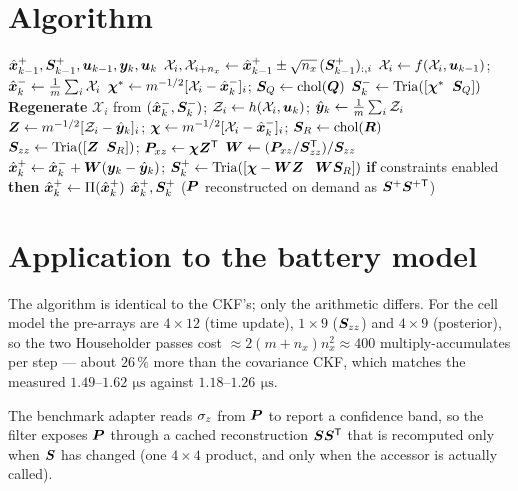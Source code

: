 \section{Algorithm}
\begin{algorithm}[H]
\caption{SCKF --- one sampling period (additive noise)}
\begin{algorithmic}[1]
\Require $\hat{\bm{x}}^{+}_{k-1},\bm{S}^+_{k-1},\bm{u}_{k-1},\bm{y}_k,\bm{u}_k$
\State $\mathcal{X}_{i},\mathcal{X}_{i+n_x}\gets\hat{\bm{x}}^{+}_{k-1}\pm\sqrt{n_x}\,(\bm{S}^+_{k-1})_{:,i}$
\State $\mathcal{X}_i \gets f(\mathcal{X}_i,\bm{u}_{k-1})$;\; $\hat{\bm{x}}^{-}_k\gets\frac{1}{m}\sum_i\mathcal{X}_i$
\State $\bm{\chi}^*\gets m^{-1/2}[\mathcal{X}_i-\hat{\bm{x}}^{-}_k]_i$;\; $\bm{S}_Q\gets\operatorname{chol}(\bm{Q})$
\State $\bm{S}^-_k\gets\operatorname{Tria}([\bm{\chi}^*\;\;\bm{S}_Q])$
\State \textbf{Regenerate} $\mathcal{X}_i$ from $(\hat{\bm{x}}^{-}_k,\bm{S}^-_k)$;\;
       $\mathcal{Z}_i\gets h(\mathcal{X}_i,\bm{u}_k)$;\; $\hat{\bm{y}}_k\gets\frac1m\sum_i\mathcal{Z}_i$
\State $\bm{Z}\gets m^{-1/2}[\mathcal{Z}_i-\hat{\bm{y}}_k]_i$;\; $\bm{\chi}\gets m^{-1/2}[\mathcal{X}_i-\hat{\bm{x}}^{-}_k]_i$;\;
       $\bm{S}_R\gets\operatorname{chol}(\bm{R})$
\State $\bm{S}_{zz}\gets\operatorname{Tria}([\bm{Z}\;\;\bm{S}_R])$;\; $\bm{P}_{xz}\gets\bm{\chi}\bm{Z}^{\mathsf{T}}$
\State $\bm{W}\gets(\bm{P}_{xz}/\bm{S}_{zz}^{\mathsf{T}})/\bm{S}_{zz}$ 
\State $\hat{\bm{x}}^{+}_k\gets\hat{\bm{x}}^{-}_k+\bm{W}(\bm{y}_k-\hat{\bm{y}}_k)$;\;
       $\bm{S}^+_k\gets\operatorname{Tria}([\bm{\chi}-\bm{W}\bm{Z}\;\;\;\bm{W}\bm{S}_R])$
\State \textbf{if} constraints enabled \textbf{then} $\hat{\bm{x}}^{+}_k\gets\Pi(\hat{\bm{x}}^{+}_k)$
\Ensure $\hat{\bm{x}}^{+}_k,\bm{S}^+_k$ \quad ($\bm{P}$ reconstructed on demand as $\bm{S}^+\bm{S}^{+\mathsf{T}}$)
\end{algorithmic}
\end{algorithm}

\section{Application to the battery model}
The algorithm is identical to the CKF's; only the arithmetic differs. For the cell model the
pre-arrays are $4\times12$ (time update), $1\times9$ ($\bm{S}_{zz}$) and $4\times9$ (posterior),
so the two Householder passes cost $\approx 2(m+n_x)n_x^2 \approx 400$ multiply-accumulates
per step --- about $26\,\%$ more than the covariance CKF, which matches the measured
$1.49$--$1.62\,\SI{}{\micro\second}$ against $1.18$--$1.26\,\SI{}{\micro\second}$.

The benchmark adapter reads $\sigma_z$ from $\bm{P}$ to report a confidence band, so the
filter exposes $\bm{P}$ through a cached reconstruction $\bm{S}\bm{S}^{\mathsf{T}}$ that is recomputed only when
$\bm{S}$ has changed (one $4\times4$ product, and only when the accessor is actually called).

